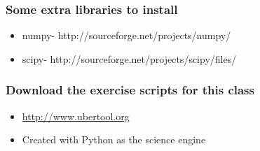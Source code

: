 \documentclass{beamer}
\begin{document}
\begin{frame}[fragile]
\frametitle{Some extra libraries to install}
\begin{itemize}
  \item{numpy- http://sourceforge.net/projects/numpy/}
  \item{scipy- http://sourceforge.net/projects/scipy/files/}
\end{itemize} 
\end{frame}


\begin{frame}[fragile]
\frametitle{Download the exercise scripts for this class}
\begin{itemize}
  \item \href{http://www.ubertool.org}{http://www.ubertool.org}
  \item Created with Python as the science engine
\end{itemize} 
\end{frame}
\end{document}
